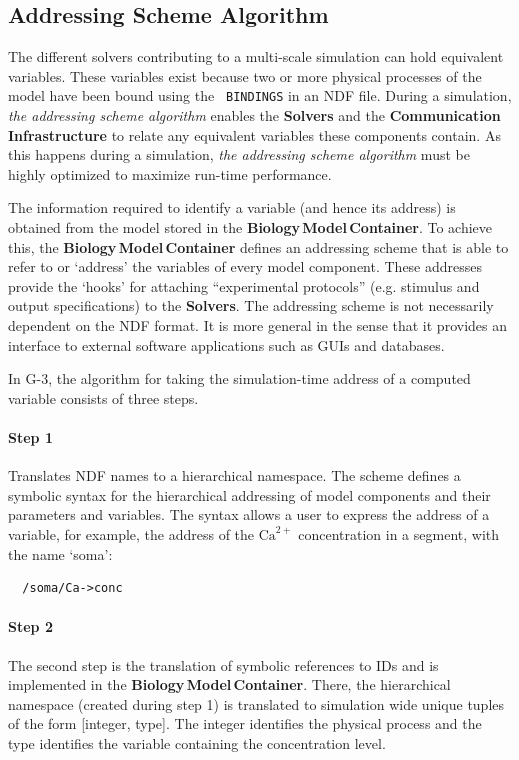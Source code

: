 \documentclass{article}
\begin{document}
\subsection{Addressing Scheme Algorithm}

The different solvers contributing to a multi-scale simulation can
hold equivalent variables.  These variables exist because two or more
physical processes of the model have been bound using the {\tt
  BINDINGS} in an NDF file.  During a simulation, {\it the addressing
  scheme algorithm} enables the {\bf Solvers} and the {\bf
  Communication\,Infrastructure} to relate any equivalent variables
these components contain.  As this happens during a simulation, {\it
  the addressing scheme algorithm} must be highly optimized to
maximize run-time performance.

The information required to identify a variable (and hence its
address) is obtained from the model stored in the {\bf
  Biology\,Model\,Container}. To achieve this, the {\bf
  Biology\,Model\,Container} defines an addressing scheme that is able
to refer to or `address' the variables of every model component.
These addresses provide the `hooks' for attaching ``experimental
protocols'' (e.g. stimulus and output specifications) to the {\bf
  Solvers}.  The addressing scheme is not necessarily dependent on the
NDF format. It is more general in the sense that it provides an
interface to external software applications such as GUIs and
databases.

In G-3, the algorithm for taking the simulation-time address of a
computed variable consists of three steps.

\paragraph{Step 1} Translates NDF names to a hierarchical namespace.
The scheme defines a symbolic syntax for the hierarchical addressing
of model components and their parameters and variables.  The syntax
allows a user to express the address of a variable, for example, the
address of the $\mathrm{Ca}^{2+}$ concentration in a segment, with the
name `soma':

\begin{verbatim}
  /soma/Ca->conc
\end{verbatim}

\paragraph{Step 2} The second step is the translation of symbolic
references to IDs and is implemented in the {\bf
  Biology\,Model\,Container}. There, the hierarchical namespace
(created during step 1) is translated to simulation wide unique tuples
of the form [integer, type].  The integer identifies the physical
process and the type identifies the variable containing the
concentration level.
\end{document}
